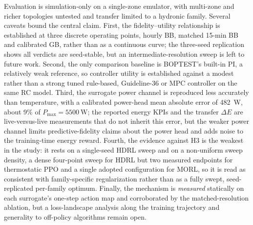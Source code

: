 Evaluation is simulation-only on a single-zone emulator, with multi-zone and richer topologies
untested and transfer limited to a hydronic family. Several caveats bound the central claim. First,
the fidelity--utility relationship is established at three discrete operating points, hourly BB,
matched 15-min BB and calibrated GB, rather than as a continuous curve; the three-seed replication
shows all verdicts are seed-stable, but an intermediate-resolution sweep is left to future work.
Second, the only comparison baseline is BOPTEST's built-in PI, a relatively weak reference, so
controller utility is established against a modest rather than a strong tuned rule-based,
Guideline-36 or MPC controller on the same RC model. Third, the surrogate power channel is
reproduced less accurately than temperature, with a calibrated power-head mean absolute error of
\SI{482}{\watt}, about 9\% of $P_{\max}=\SI{5500}{\watt}$; the reported energy KPIs and the transfer
$\Delta E$ are live-versus-live measurements that do not inherit this error, but the weaker power
channel limits predictive-fidelity claims about the power head and adds noise to the training-time
energy reward. Fourth, the evidence against H3 is the weakest in the study: it rests on a
single-seed HDRL sweep and on a non-uniform sweep density, a dense four-point sweep for HDRL but two
measured endpoints for thermostatic PPO and a single adopted configuration for MORL, so it is read
as consistent with family-specific regularization rather than as a fully swept, seed-replicated
per-family optimum. Finally, the mechanism is
\emph{measured} statically on each surrogate's one-step action map and corroborated by the
matched-resolution ablation, but a loss-landscape analysis along the training trajectory and
generality to off-policy algorithms remain open.
